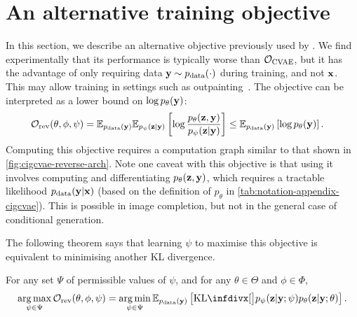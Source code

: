 \section{An alternative training objective}
\label{supp:cigcvae-ipa-r}
In this section, we describe an alternative objective previously used by
\citet{ma2018eddi}. We find experimentally that its performance is typically
worse than ${\mathcal{O}}_\text{CVAE}$, but it has the advantage of only
requiring data ${\mathbf{y}} \sim p_{\rm{data}} (\cdot)$ during training, and not ${\mathbf{x}}$.
This may allow training in settings such as
outpainting~\citep{sabini2018painting}. The objective can be interpreted as a
lower bound on $\log p_\theta({\mathbf{y}})$:
\begin{align} \label{eq:reverse-obj}
  \mathcal{O}_\text{rev}(\theta, \phi, \psi ) &= \mathbb{E}_{p_{\rm{data}} ({\mathbf{y}})}\mathbb{E}_{p_\psi({\mathbf{z}}|{\mathbf{y}})} \left[ \log\frac{p_\theta({\mathbf{z}},{\mathbf{y}})}{p_\psi({\mathbf{z}}|{\mathbf{y}})} \right] \leq \mathbb{E}_{p_{\rm{data}} ({\mathbf{y}})} \left[ \log p_\theta({\mathbf{y}}) \right].
\end{align}
Computing this objective requires a computation graph similar to that shown in
\cref{fig:cigcvae-reverse-arch}. Note one caveat with this objective is that using it
involves computing and differentiating $p_\theta({\mathbf{z}},{\mathbf{y}})$, which requires a
tractable likelihood $p_{\rm{data}} ({\mathbf{y}}|{\mathbf{x}})$ (based on the definition of
$p_\theta$ in \cref{tab:notation-appendix-cigcvae}). This is possible in image completion, but
not in the general case of conditional generation.

The following theorem says that learning $\psi $ to maximise this objective
is equivalent to minimising another KL divergence.
\begin{theorem} \label{theorem:reverse-kl} For any set $\Psi$ of
  permissible values of $\psi $, and for any $\theta\in\Theta$ and
  $\phi\in\Phi$,
  \begin{equation}
    \argmax_{\psi  \in \Psi} \mathcal{O}_\text{rev}(\theta, \phi, \psi ) = \argmin_{\psi  \in \Psi} \EX_{\pdata (\rvy)} \left[ \kl[\big] { p_\psi(\rvz|\rvy; \psi) }{ p_\theta(\rvz|\rvy; \theta) } \right].
  \end{equation}
\end{theorem}


